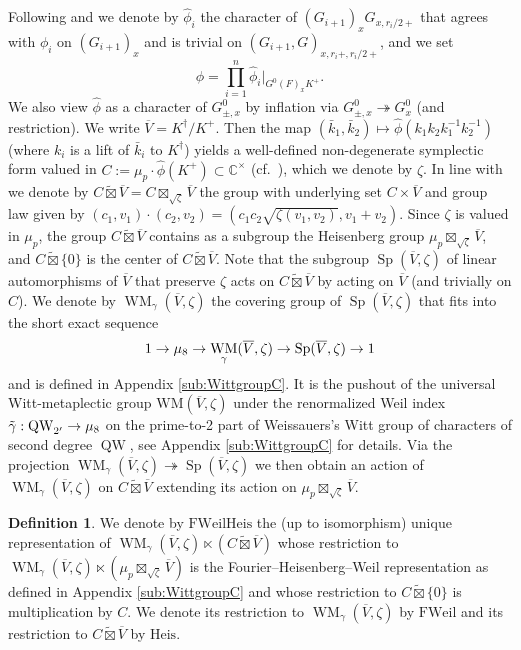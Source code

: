 \documentclass{article}
\def\tx#1{\textrm{#1}}
\def\ol#1{\overline{#1}}
\def\hat{\widehat}
\newcommand{\bC}{\mathbb{C}}
\DeclareMathOperator{\Sp}{Sp}
\theoremstyle{definition}
\newtheorem{dfn}[thm]{Definition}
\numberwithin{equation}{subsection}
\renewcommand{\-}{\hyp{}}
\DeclareMathOperator{\WM}{WM}
\newcommand{\WMuniv}{\mathrm{WM}}
\DeclareMathOperator{\QW}{QW}
\begin{document}
Following \cite[\S4]{Yu01} and \cite[Lemma~4.2.1]{FS25} we denote by $\hat \phi_i$ the character of $(G_{i+1})_{x}G_{x,r_i/2+}$ that agrees with $\phi_i$ on $(G_{i+1})_{x}$ and is trivial on $(G_{i+1},G)_{x,r_i+,r_i/2+}$, and we set 
\[\hat \phi =\prod_{i=1}^n \hat \phi_i|_{G^0(F)_xK^+} .\] We also view $\hat \phi$ as a character of $G^0_{\pm, x}$ by inflation via $G^0_{\pm, x} \twoheadrightarrow G^0_{x}$ (and restriction).
We write $\ol{V}=K^\dagger/K^+$. Then the map $(\bar k_1, \bar k_2) \mapsto \hat \phi(k_1k_2k_1^{-1}k_2^{-1})$ (where $k_i$ is a lift of $\bar k_i$ to $K^\dagger$) yields a well-defined non-degenerate symplectic form valued in $C:=\mu_p \cdot \hat \phi (K^+) \subset \bC^\times$ (cf.\ \cite[2.5.13]{DF}), which we denote by $\zeta$. In line with \cite[3.6.1]{DF} we denote by $C \widetilde{\boxtimes} \ol{V}=C \boxtimes_{\sqrt{\zeta}} \ol{V}$
 the group with underlying set $C \times \ol{V}$ and group law given by $(c_1,v_1)\cdot (c_2,v_2)=(c_1c_2\sqrt{\zeta(v_1,v_2)}, v_1+v_2)$. Since $\zeta$ is valued in $\mu_p$, the group $C \widetilde{\boxtimes} \ol{V}$ contains as a subgroup the Heisenberg group $\mu_p \boxtimes_{\sqrt{\zeta}} \ol{V}$, and $C \widetilde{\boxtimes} \{0\}$ is the center of  $C \widetilde{\boxtimes} \ol{V}$. Note that the subgroup $\Sp(\ol{V},\zeta)$ of linear automorphisms of $\ol{V}$ that preserve $\zeta$ acts on  $C \widetilde{\boxtimes} \ol{V}$ by acting on $\ol{V}$ (and trivially on $C$).
 We denote by $\WM_\gamma(\ol{V}, \zeta)$ the covering group of $\Sp(\ol{V}, \zeta)$ that fits into the short exact sequence
 \[ 1 \ra \mu_8 \ra \WM_\gamma(\ol{V}, \zeta) \ra \Sp(\ol{V}, \zeta) \ra 1 \]
 and is defined in Appendix \ref{sub:WittgroupC}. It is the pushout of the universal Witt-metaplectic group $\WMuniv(\ol{V}, \zeta)$ under the renormalized Weil index $\tilde\gamma:\QW_{2'} \ra \mu_8$ on the prime-to-2 part of Weissauers's Witt group of characters of second degree $\QW$, see  Appendix \ref{sub:WittgroupC} for details.
Via the projection $\WM_\gamma(\ol{V}, \zeta) \twoheadrightarrow \Sp(\ol{V},\zeta)$ we then obtain an action of $\WM_\gamma(\ol{V}, \zeta)$ on $C \widetilde{\boxtimes} \ol{V}$ extending its action on $\mu_p \boxtimes_{\sqrt{\zeta}} \ol{V}$.
 
\begin{dfn}
	We denote by $\mathrm{FWeilHeis}$ the (up to isomorphism) 
unique representation of $\WM_\gamma(\ol{V}, \zeta) \ltimes (C \widetilde{\boxtimes} \ol{V})$ whose restriction to $\WM_\gamma(\ol{V}, \zeta) \ltimes (\mu_p \boxtimes_{\sqrt{\zeta}} \ol{V})$ is the Fourier--Heisenberg--Weil representation as defined in Appendix \ref{sub:WittgroupC}  and whose restriction to $C \widetilde{\boxtimes} \{0\}$ is multiplication by $C$. We denote its restriction to $\WM_\gamma(\ol{V}, \zeta)$ by $\mathrm{FWeil}$ and its restriction to $C \widetilde{\boxtimes} \ol{V}$ by $\tx{Heis}$. \end{dfn}
\end{document}
